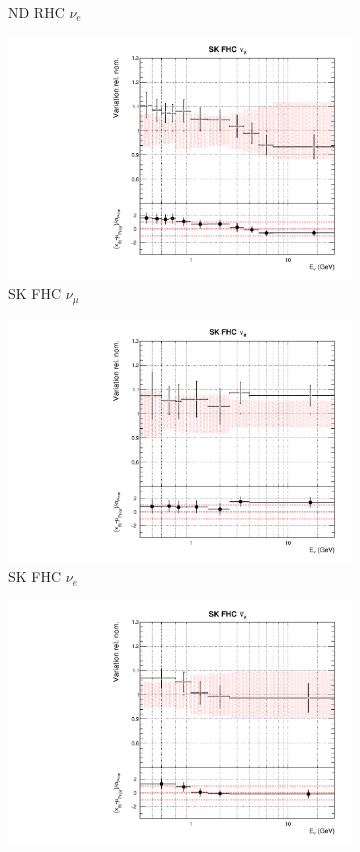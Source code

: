 \begin{figure}
\begin{subfigure}{0.24\textwidth}
  \caption{ND RHC $\nu_e$}
\end{subfigure}
\begin{subfigure}{0.24\textwidth}
  \centering
  \includegraphics[width=0.95\linewidth]{figs/datflux8}
  \caption{SK FHC $\nu_{\mu}$}
\end{subfigure}
\begin{subfigure}{0.24\textwidth}
  \centering
  \includegraphics[width=0.95\linewidth]{figs/datflux9}
  \caption{SK FHC $\nu_e$}
\end{subfigure}
\begin{subfigure}{0.24\textwidth}
  \centering
  \includegraphics[width=0.95\linewidth]{figs/datflux10}

\end{subfigure}
\end{figure}
